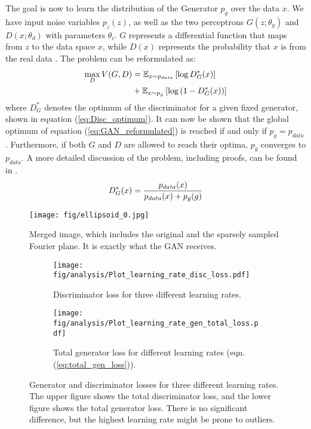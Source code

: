 The goal is now to learn the distribution of the Generator $p_g$ over the data $x$. We have input noise variables $p_z(z)$, as well as the two perceptrons $G(z; \theta_g)$ and $D(x; \theta_d)$ with parameters $\theta_i$. $G$ represents a differential function that maps from $z$ to the data space $x$, while $D(x)$ represents the probability that $x$ is from the real data \cite{goodfellow2014generative}. The problem can be reformulated as: 
\begin{equation}
	\centering
	\begin{aligned}
		\max_{D} V(G, D) &= \mathbb{E}_{x \sim p_{data}} \left[ \log D^{*}_{G}(x) \right] \\ 
		&+ \mathbb{E}_{x \sim p_{g}} \left[ \log \left( 1 - D^{*}_{G}(x) \right) \right]
	\end{aligned}
	\label{eq:GAN_reformulated}
\end{equation}
where $D^{*}_{G}$ denotes the optimum of the discriminator for a given fixed generator, shown in equation (\ref{eq:Disc_optimum}). It can now be shown that the global optimum of equation (\ref{eq:GAN_reformulated}) is reached if and only if $p_g = p_{data}$. Furthermore, if both $G$ and $D$ are allowed to reach their optima, $p_g$ converges to $p_{data}$. A more detailed discussion of the problem, including proofs, can be found in \cite{goodfellow2014generative}. 
\begin{equation}
	\centering
	D^*_G(x) = \frac{p_{data}(x)}{p_{data}(x) + p_g(g)}
	\label{eq:Disc_optimum}
\end{equation}
\begin{figure}
	\centering
	\texttt{[image: fig/ellipsoid\_0.jpg]}
	\caption{Merged image, which includes the original and the sparsely sampled Fourier plane. It is exactly what the GAN receives. }
	\label{fig:GANinput}
\end{figure}
\begin{figure}
	\centering
	\begin{subfigure}{\linewidth}
		\centering
		\texttt{[image: fig/analysis/Plot\_learning\_rate\_disc\_loss.pdf]}
		\caption{Discriminator loss for three different learning rates. }
		\label{fig:Plot_learning_rate_discloss}
	\end{subfigure}\hfill
	\begin{subfigure}{\linewidth}
		\centering
		\texttt{[image: fig/analysis/Plot\_learning\_rate\_gen\_total\_loss.pdf]}
		\caption{Total generator loss for different learning rates (eqn. (\ref{eq:total_gen_loss})).}
		\label{fig:Plot_learning_rate_genloss}
	\end{subfigure}\hfill
	\caption{Generator and discriminator losses for three different learning rates. The upper figure shows the total discriminator loss, and the lower figure shows the total generator loss. There is no significant difference, but the highest learning rate might be prone to outliers. }
	\label{fig:Plot_learning_rate_loss}
\end{figure}
